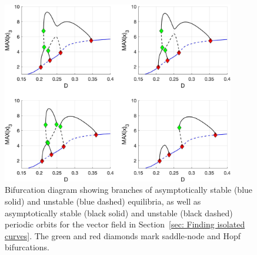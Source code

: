 \begin{figure}[h]
\centering
\includegraphics[width=4in]{Figures/Section4_2_1.jpg}
\caption{Bifurcation diagram showing branches of asymptotically stable (blue solid) and unstable (blue dashed) equilibria, as well as asymptotically stable (black solid) and unstable (black dashed) periodic orbits for the vector field in Section~\ref{sec: Finding isolated curves}. The green and red diamonds mark saddle-node and Hopf bifurcations.}
\label{fig: Section4_2_1}
\end{figure}

